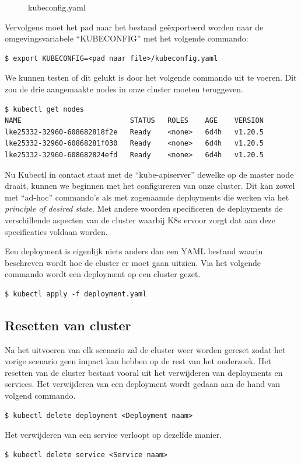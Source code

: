 \begin{figure}[h] 
	\inputminted[fontsize=\footnotesize,linenos]{yaml}{files/BachTest-kubeconfig.yaml}
	\caption{kubeconfig.yaml}
	\label{kubeconfig}
\end{figure}

Vervolgens moet het pad naar het bestand geëxporteerd worden naar de omgevingsvariabele ``KUBECONFIG'' met het volgende commando:
\begin{verbatim}
$ export KUBECONFIG=<pad naar file>/kubeconfig.yaml
\end{verbatim}

We kunnen testen of dit gelukt is door het volgende commando uit te voeren. Dit zou de drie aangemaakte nodes in onze cluster moeten teruggeven.
\begin{verbatim}
$ kubectl get nodes
NAME                          STATUS   ROLES    AGE    VERSION
lke25332-32960-608682818f2e   Ready    <none>   6d4h   v1.20.5
lke25332-32960-60868281f030   Ready    <none>   6d4h   v1.20.5
lke25332-32960-608682824efd   Ready    <none>   6d4h   v1.20.5
\end{verbatim}

Nu Kubectl in contact staat met de ``kube-apiserver'' dewelke op de master node draait, kunnen we beginnen met het configureren van onze cluster. Dit kan zowel met ``ad-hoc'' commando's als met zogenaamde deployments die werken via het \textit{principle of desired state}. Met andere woorden specificeren de deployments de verschillende  aspecten van de cluster waarbij K8s ervoor zorgt dat aan deze specificaties voldaan worden.

Een deployment is eigenlijk niets anders dan een YAML bestand waarin beschreven wordt hoe de cluster er moet gaan uitzien. Via het volgende commando wordt een deployment op een cluster gezet.
\begin{verbatim}
$ kubectl apply -f deployment.yaml
\end{verbatim}

\subsection{Resetten van cluster}
Na het uitvoeren van elk scenario zal de cluster weer worden gereset zodat het vorige scenario geen impact kan hebben op de rest van het onderzoek. Het resetten van de cluster bestaat vooral uit het verwijderen van deployments en services. Het verwijderen van een deployment wordt gedaan aan de hand van volgend commando.
\begin{verbatim}
$ kubectl delete deployment <Deployment naam>
\end{verbatim}
Het verwijderen van een service verloopt op dezelfde manier.
\begin{verbatim}
$ kubectl delete service <Service naam>
\end{verbatim}
	
